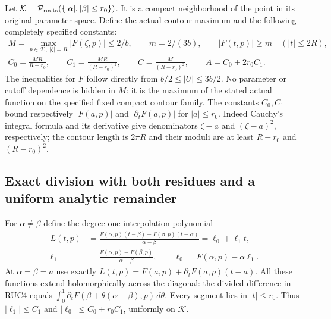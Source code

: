 Let $\mathcal K=\mathcal P_{\rm roots}
(\{|\alpha|,|\beta|\le r_0\})$.  It is a compact neighborhood of
the point in its original parameter space.  Define the actual
contour maximum and the following completely specified constants:
\[
 \begin{gathered}
 M=\max_{p\in\mathcal K,\ |\zeta|=R}|F(\zeta,p)|\le2/b,
 \qquad m=2/(3b),\qquad |F(t,p)|\ge m\quad(|t|\le2R),\\
 C_0=\frac{MR}{R-r_0},\qquad C_1=\frac{MR}{(R-r_0)^2},\qquad
 C=\frac{M}{(R-r_0)^2},\qquad A=C_0+2r_0C_1.
 \end{gathered}\tag{RUC3}
\]
The inequalities for $F$ follow directly from
$b/2\le|U|\le3b/2$.  No parameter or cutoff dependence is hidden
in $M$: it is the maximum of the stated actual function on the
specified fixed compact contour family.  The constants $C_0,C_1$
bound respectively $|F(a,p)|$ and $|\partial_tF(a,p)|$ for
$|a|\le r_0$.  Indeed Cauchy's integral formula and its derivative
give denominators $\zeta-a$ and $(\zeta-a)^2$, respectively;
the contour length is $2\pi R$ and their moduli are at least
$R-r_0$ and $(R-r_0)^2$.

\subsection{Exact division with both residues and a uniform analytic remainder}

For $\alpha\ne\beta$ define the degree-one interpolation polynomial
\[
 \begin{aligned}
 L(t,p)&=\frac{F(\alpha,p)(t-\beta)-F(\beta,p)(t-\alpha)}
                     {\alpha-\beta}=\ell_0+\ell_1t,\\
 \ell_1&=\frac{F(\alpha,p)-F(\beta,p)}{\alpha-\beta},\qquad
 \ell_0=F(\alpha,p)-\alpha\ell_1.
 \end{aligned}\tag{RUC4}
\]
At $\alpha=\beta=a$ use exactly
$L(t,p)=F(a,p)+\partial_tF(a,p)(t-a)$.
All these functions extend holomorphically across the diagonal:
the divided difference in RUC4 equals
$\int_0^1\partial_tF(\beta+\theta(\alpha-\beta),p)\,d\theta$.
Every segment lies in $|t|\le r_0$.
Thus $|\ell_1|\le C_1$ and
$|\ell_0|\le C_0+r_0C_1$, uniformly on $\mathcal K$.


